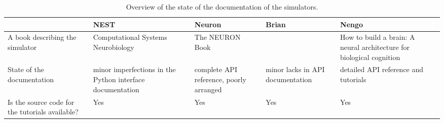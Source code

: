\begin{table}[htbp]
    \centering
    \begin{sideways}
        \begin{tabularx}{0.7\textheight}{*{5}{>{\raggedright\arraybackslash}X}}
            \toprule
             & NEST & Neuron & Brian & Nengo \\
            \midrule
            A book describing the simulator & Computational Systems Neurobiology \cite{lenovereComputationalSystemsNeurobiology2012}
            & The NEURON Book \cite{carnevaleNEURONBook06} & & How to build a brain: A neural architecture for biological cognition \cite{eliasmithHowBuild13} \\
            State of the documentation & minor imperfections in the Python interface documentation & complete API reference, poorly arranged & minor lacks in API documentation & detailed API reference and tutorials \\
            Is the source code for the tutorials available? & Yes & Yes & Yes & Yes \\
            \bottomrule
        \end{tabularx}
    \end{sideways}
    \caption{Overview of the state of the documentation of the simulators.}
    \label{tab:c}
\end{table}


